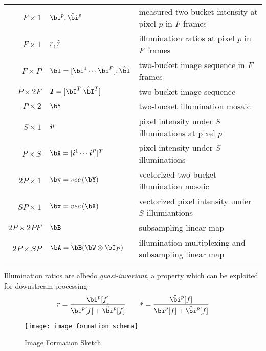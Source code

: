 \documentclass[../writeup.tex]{subfiles}
\begin{document}
\begin{table}[!htbp]
\begin{center}
\begin{tabular}{rll}
        $F \times 1$         & $\bi^p,\hat{\bi}^p$                     & measured two-bucket intensity at pixel $p$ in $F$ frames \\
        $F \times 1$         & $r,\hat{r}$                             & illumination ratios at pixel $p$ in $F$ frames \\
        $F\times P$          & $\bI = [\bi^1 \cdots \bi^P],\hat{\bI}$  & two-bucket image sequence in $F$ frames \\ 
        $P\times 2F$         & $\sI = [\bI^T \;\hat{\bI}^T]$           & two-bucket image sequence \\
        $P\times 2$          & $\bY$                                   & two-bucket illumination mosaic \\
        $S\times 1$          & $\boldsymbol{i}^p$                                 & pixel intensity under $S$ illuminations at pixel $p$ \\
        $P\times S$          & $\bX = [\si^1 \cdots \si^P]^T$          & pixel intensity under $S$ illuminations \\    
        $2P\times 1$         & $\by = \vec{\bY}$                       & vectorized two-bucket illumination mosaic \\
        $SP\times 1$         & $\bx = \vec{\bX}$                       & vectorized pixel intensity under $S$ illumiantions \\
        $2P\times 2PF$       & $\bB$                                   & subsampling linear map \\
        $2P\times SP$        & $\bA = \bB(\bW\otimes \bI_P)$           & illumination multiplexing and subsampling linear map \\
    \end{tabular}
    \end{center}
\end{table}
\noindent Illumination ratios are albedo \textit{quasi-invariant}, a property which can be exploited for downstream processing
\[
    r = \frac{\bi^p[f]}{\bi^p[f] + \hat{\bi}^p[f]} 
    \quad\quad
    \hat{r} =   \frac{\hat{\bi}^p[f]}{\bi^p[f] + \hat{\bi}^p[f]} 
\]

\begin{figure}[h!]
    \begin{center}
        \texttt{[image: image\_formation\_schema]}
    \end{center}
    \caption{Image Formation Sketch}
    \label{fig:image_formation_schema}
\end{figure}
\end{document}
